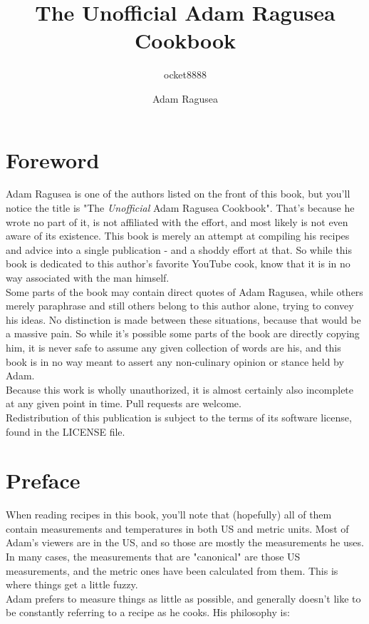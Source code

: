 \documentclass{book}
\title{The Unofficial Adam Ragusea Cookbook}
\author{ocket8888 \and Adam Ragusea}
\begin{document}
\maketitle{}

\chapter*{Foreword}
Adam Ragusea is one of the authors listed on the front of this book, but you'll
notice the title is "The \emph{Unofficial} Adam Ragusea Cookbook". That's
because he wrote no part of it, is not affiliated with the effort, and most
likely is not even aware of its existence. This book is merely an attempt at
compiling his recipes and advice into a single publication - and a shoddy effort
at that. So while this book is dedicated to this author's favorite YouTube cook,
know that it is in no way associated with the man himself.\\
Some parts of the book may contain direct quotes of Adam Ragusea, while others
merely paraphrase and still others belong to this author alone, trying to convey
his ideas. No distinction is made between these situations, because that would
be a massive pain. So while it's possible some parts of the book are directly
copying him, it is never safe to assume any given collection of words are his,
and this book is in no way meant to assert any non-culinary opinion or stance
held by Adam.\\
Because this work is wholly unauthorized, it is almost certainly also incomplete
at any given point in time. Pull requests are welcome.\\
Redistribution of this publication is subject to the terms of its software
license, found in the LICENSE file.\\

\tableofcontents{}

\chapter*{Preface}
When reading recipes in this book, you'll note that (hopefully) all of them
contain measurements and temperatures in both US and metric units. Most of
Adam's viewers are in the US, and so those are mostly the measurements he uses.
In many cases, the measurements that are "canonical" are those US measurements,
and the metric ones have been calculated from them. This is where things get a
little fuzzy.\\
Adam prefers to measure things as little as possible, and generally doesn't like
to be constantly referring to a recipe as he cooks. His philosophy is:
\end{document}

